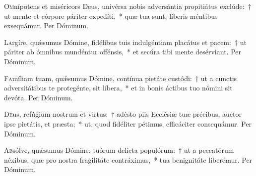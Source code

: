 \documentclass[vesperale_romanum.tex]{subfiles}
\begin{document}

\oratio

\lettrine{O}{m}nípotens et miséricors Deus, univérsa nobis adversántia propitiátus exclúde:~† ut mente et córpore páriter expedíti,~* quæ tua sunt, líberis méntibus exsequámur. Per Dóminum.



\oratio

\lettrine{L}{a}rgíre, quǽsumus Dómine, fidélibus tuis indulgéntiam placátus et pacem:~† ut páriter ab ómnibus mundéntur offénsis,~* et secúra tibi mente desérviant. Per Dóminum.



\oratio

\lettrine{F}{a}míliam tuam, quǽsumus Dómine, contínua pietáte custódi:~† ut a cunctis adversitátibus te protegénte, sit líbera,~* et in bonis áctibus tuo nómini sit devóta. Per Dóminum.



\oratio

\lettrine{D}{e}us, refúgium nostrum et virtus:~† adésto piis Ecclésiæ tuæ précibus, auctor ipse pietátis, et præsta;~* ut, quod fidéliter pétimus, efficáciter consequámur. Per Dóminum.




\oratio

\lettrine{A}{b}sólve, quǽsumus Dómine, tuórum delícta populórum:~† ut a peccatórum néxibus, quæ pro nostra fragilitáte contráximus,~* tua benignitáte liberémur. Per Dóminum.

\end{document}
